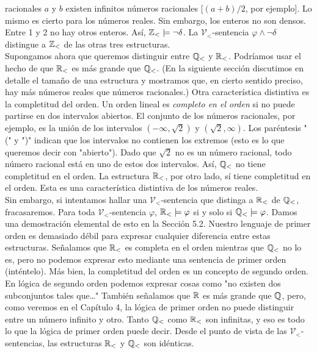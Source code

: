 \message{ !name(main.tex)}\documentclass[12pt,a4paper]{book}
\newcommand{\comillas}[1]{"#1"}
\newcommand{\VV}{\mathcal{V}}
\begin{document}
    racionales $a$ y $b$ existen infinitos números racionales [$(a+b)/2$, por ejemplo]. Lo mismo es cierto para los números
    reales. Sin embargo, los enteros no son densos. Entre 1 y 2 no hay otros enteros. Así, $\mathbb{Z}_{<}\models\neg\delta$. La
    $\VV_{<}$-sentencia $\varphi\wedge\neg\delta$ distingue a $\mathbb{Z}_{<}$ de las otras tres estructuras.\\
    Supongamos ahora que queremos distinguir entre $\mathbb{Q}_{<}$ y $\mathbb{R}_{<}$. Podríamos usar el hecho de que $\mathbb{R}_{<}$ es más
    grande que $\mathbb{Q}_{<}$. (En la siguiente sección discutimos en detalle el tamaño de una estructura y mostramos que, en
    cierto sentido preciso, hay más números reales que números racionales.) Otra característica distintiva es la
    completitud del orden. Un orden lineal es \textit{completo en el orden} si no puede partirse en dos intervalos
    abiertos. El conjunto de los números racionales, por ejemplo, es la unión de los intervalos $(-\infty,\sqrt{2})$ y
    $(\sqrt{2},\infty)$. Los paréntesis \comillas{(} y \comillas{)} indican que los intervalos no contienen los extremos
    (esto es lo que queremos decir con \comillas{abierto}). Dado que $\sqrt{2}$ no es un número racional, todo número
    racional está en uno de estos dos intervalos. Así, $\mathbb{Q}_{<}$ no tiene completitud en el orden. La estructura $\mathbb{R}_{<}$,
    por otro lado, sí tiene completitud en el orden. Esta es una característica distintiva de los números reales.\\
    Sin embargo, si intentamos hallar una $\VV_{<}$-sentencia que distinga a $\mathbb{R}_{<}$ de $\mathbb{Q}_{<}$, fracasaremos. Para toda
    $\VV_{<}$-sentencia $\varphi$, $\mathbb{R}_{<}\models\varphi$ si y solo si $\mathbb{Q}_{<}\models\varphi$. Damos una demostración
    elemental de esto en la Sección 5.2. Nuestro lenguaje de primer orden es demasiado débil para expresar cualquier
    diferencia entre estas estructuras. Señalamos que $\mathbb{R}_{<}$ es completa en el orden mientras que $\mathbb{Q}_{<}$ no lo es, pero
    no podemos expresar esto mediante una sentencia de primer orden (inténtelo). Más bien, la completitud del orden es un
    concepto de segundo orden. En lógica de segundo orden podemos expresar cosas como \comillas{no existen dos
    subconjuntos tales que\dots} También señalamos que $\mathbb{R}$ es más grande que $\mathbb{Q}$, pero, como veremos en el Capítulo 4, la
    lógica de primer orden no puede distinguir entre un número infinito y otro. Tanto $\mathbb{Q}_{<}$ como $\mathbb{R}_{<}$ son infinitas,
    y eso es todo lo que la lógica de primer orden puede decir. Desde el punto de vista de las $\VV_{<}$-sentencias, las
    estructuras $\mathbb{R}_{<}$ y $\mathbb{Q}_{<}$ son idénticas.
\end{document}
